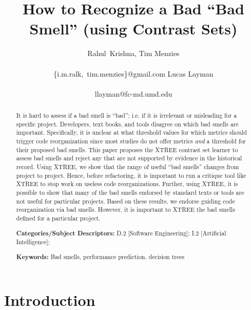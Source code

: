 \documentclass{sig-alternate}
\begin{document}
  


\title{  How to Recognize  a Bad  ``Bad Smell'' (using Contrast Sets)}
\author{  
\alignauthor
Rahul~Krishna, Tim Menzies  \\
       \\
       {\{i.m.ralk,~tim.menzies\}@gmail.com}
\alignauthor
Lucas Layman \\
       \\ 
       {llayman@fc-md.umd.edu}
\setlength{\columnsep}{7mm}}
\maketitle
\begin{abstract} 
It is hard to assess
if a bad smell is ``bad''; i.e. if it is irrelevant or misleading
for a specific project.
Developers, text books, and tools
disagree on which bad smells are important.
Specifically, it is unclear at what threshold values
for which metrics should trigger code reorganization since
most studies do not offer
metrics {\em and} a threshold for their proposed bad smells.
This paper proposes the XTREE contrast set
learner to assess bad smells
and reject any that are not supported by
evidence in the historical record.  
Using XTREE, we   show that the range of useful
``bad smells'' changes from project to project. Hence,
before refactoring, it is important to run a critique tool
like XTREE to stop work on useless code reorganizations.
Further, using XTREE, it is possible to show that many
of the bad smells endorsed by standard texts or tools
are not useful for particular projects. 
Based on these results, we endorse  
guiding code reorganization via bad smells. However,  
it is important to XTREE the bad smells defined for a 
particular project.

 
{\bf Categories/Subject Descriptors:} D.2 [Software Engineering]; I.2 [Artificial Intelligence];

 
{\bf Keywords:} Bad smells,
performance prediction,  decision trees 
\end{abstract}

\section{Introduction}


\end{document}
